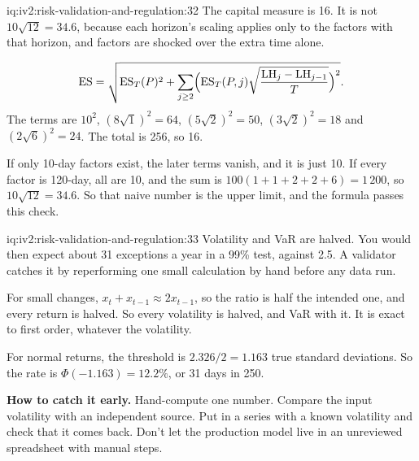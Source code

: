 \begin{solution}{iq:iv2:risk-validation-and-regulation:32}
The capital measure is 16. It is not $10\sqrt{12} = 34.6$, because each horizon's scaling applies only to the factors with that horizon, and factors are shocked over the extra time alone.

\[
\mathrm{ES} = \sqrt{\mathrm{ES}_T(P)^2 + \sum_{j \ge 2}\Bigl(\mathrm{ES}_T(P, j)\sqrt{\frac{\mathrm{LH}_j - \mathrm{LH}_{j-1}}{T}}\Bigr)^{2}}.
\]
The terms are $10^2$, $(8\sqrt{1})^2 = 64$, $(5\sqrt{2})^2 = 50$, $(3\sqrt{2})^2 = 18$ and $(2\sqrt{6})^2 = 24$. The total is 256, so 16.

If only 10-day factors exist, the later terms vanish, and it is just 10. If every factor is 120-day, all are 10, and the sum is $100(1 + 1 + 2 + 2 + 6) = 1\,200$, so $10\sqrt{12} = 34.6$. So that naive number is the upper limit, and the formula passes this check.

\end{solution}

\begin{solution}{iq:iv2:risk-validation-and-regulation:33}
Volatility and VaR are halved. You would then expect about 31 exceptions a year in a 99\% test, against 2.5. A validator catches it by reperforming one small calculation by hand before any data run.

For small changes, $x_t + x_{t-1} \approx 2x_{t-1}$, so the ratio is half the intended one, and every return is halved. So every volatility is halved, and VaR with it. It is exact to first order, whatever the volatility.

For normal returns, the threshold is $2.326/2 = 1.163$ true standard deviations. So the rate is $\Phi(-1.163) = 12.2\%$, or 31 days in 250.

\textbf{How to catch it early.} Hand-compute one number. Compare the input volatility with an independent source. Put in a series with a known volatility and check that it comes back. Don't let the production model live in an unreviewed spreadsheet with manual steps.

\end{solution}

